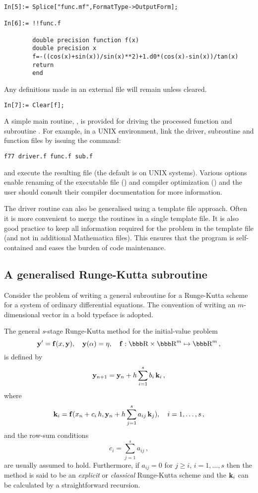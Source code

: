 \documentclass [12pt,twoside]{article}
\begin{document}
\begin{verbatim}
In[5]:= Splice["func.mf",FormatType->OutputForm];

In[6]:= !!func.f

        double precision function f(x)
        double precision x
        f=-((cos(x)+sin(x))/sin(x)**2)+1.d0*(cos(x)-sin(x))/tan(x)
        return
        end
\end{verbatim}
Any definitions made in an external file will remain unless cleared.

\begin{verbatim}
In[7]:= Clear[f];
\end{verbatim}
A simple main routine, , is provided for driving the processed
function  and subroutine . For example, in a UNIX
environment, link the driver, subroutine and function files by issuing the
command:
\begin{verbatim}
f77 driver.f func.f sub.f
\end{verbatim}
and execute the resulting file (the default is  on UNIX systems).
Various options enable renaming of the executable file () and compiler
optimization () and the user should consult their compiler documentation
for more information.

The driver routine can also be generalised using a template file approach. Often
it is more convenient to merge the routines in a single template file. It is also
good practice to keep all information required for the problem in the template
file (and not in additional Mathematica files). This ensures that the
program is self-contained and eases the burden of code maintenance.

\subsection{A generalised Runge-Kutta subroutine}

Consider the problem of writing a general subroutine for a Runge-Kutta
scheme~\cite{lambert} for a system of ordinary differential equations. The
convention of writing an $m$-dimensional vector in a bold typeface is adopted.

The general {\it s\/}-stage Runge-Kutta method for the initial-value problem
\begin{equation}\label{fo_diff_sys}
{\bf y}'={\bf f}(x,{\bf y}),\quad {\bf y}(\alpha) = {\bmit \eta
},\quad {\bf f} : \real \times \real^{m} \mapsto \real^{m} \,,
\end{equation}
is defined by
$${\bf y}_{n+1} = {\bf y}_n + h \sum_{i=1}^s b_i \, {\bf k}_i \,,$$
where
$${\bf k}_i = {\bf f}(x_n+c_i \, h,{\bf y}_n + h \sum_{j=1}^s a_{ij} \, {\bf
k}_j),\quad i = 1,\ldots,s \,,$$
and the row-sum conditions
$$c_i =\sum_{j=1}^s a_{ij} \,,$$
are usually assumed to hold. Furthermore, if $a_{ij} = 0$ for $j\ge i$, $i = 1,\ldots,s$ then
the method is said to be an {\it explicit\/} or {\it classical\/}
Runge-Kutta scheme and the ${\bf k}_i$ can be calculated by a straightforward
recursion.
\end{document}
